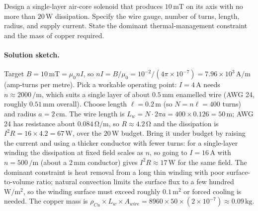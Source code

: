\begin{exercise}
Design a single-layer air-core solenoid that produces $10\,\si{\milli
\tesla}$ on its axis with no more than $20\,\si{\watt}$ dissipation.
Specify the wire gauge, number of turns, length, radius, and supply
current. State the dominant thermal-management constraint and the
mass of copper required.

\paragraph{Solution sketch.} Target $B = 10\,\si{\milli\tesla} = \mu_0 n
I$, so $nI = B/\mu_0 = 10^{-2}/(4\pi\times 10^{-7}) = 7.96\times 10^3\,
\si{\ampere\per\meter}$ (amp-turns per metre). Pick a workable
operating point: $I = 4\,\si{\ampere}$ needs $n \approx 2000\,\si{\per
\meter}$, which suits a single layer of about $0.5\,\si{\milli\meter}$
enamelled wire (AWG 24, roughly $0.51\,\si{\milli\meter}$ overall).
Choose length $\ell = 0.2\,\si{\meter}$ (so $N = n\ell = 400$ turns) and
radius $a = 2\,\si{\centi\meter}$. The wire length is $L_w = N\cdot 2\pi
a = 400\times 0.126 = 50\,\si{\meter}$; AWG 24 has resistance about
$0.084\,\si{\ohm\per\meter}$, so $R \approx 4.2\,\si{\ohm}$ and the
dissipation is $I^2 R = 16\times 4.2 = 67\,\si{\watt}$, over the
$20\,\si{\watt}$ budget. Bring it under budget by raising the current and
using a thicker conductor with fewer turns: for a single-layer winding the
dissipation at fixed field scales as $n$, so going to $I = 16\,\si{
\ampere}$ with $n = 500\,\si{\per\meter}$ (about a $2\,\si{\milli\meter}$
conductor) gives $I^2 R \approx 17\,\si{
\watt}$ for the same field. The dominant constraint is heat removal from
a long thin winding with poor surface-to-volume ratio; natural
convection limits the surface flux to a few hundred $\si{\watt\per\meter
\squared}$, so the winding surface must exceed roughly $0.1\,\si{\meter
\squared}$ or forced cooling is needed. The copper mass is $\rho_{Cu}
\times L_w\times A_{wire} = 8960\times 50\times (2\times 10^{-7})
\approx 0.09\,\si{\kilogram}$.
\end{exercise}

